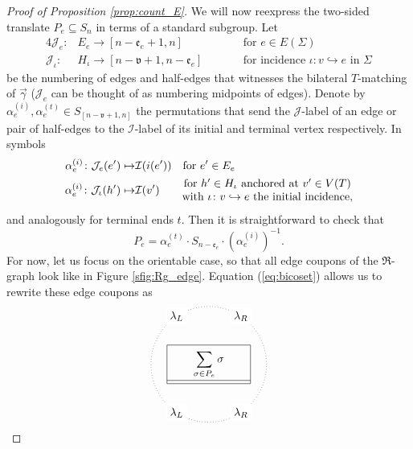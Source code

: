 \documentclass{amsart}
\begin{document}
\begin{proof}[Proof of Proposition \ref{prop:count_E}]
We will now reexpress the two-sided translate $P_e\subseteq S_n$ in terms of a standard subgroup. Let
\begin{alignat*}{4}
\mathcal{J}_e\colon&E_e\to[n-\mathfrak{e}_e+1,n]&&\text{for }e\in E(\Sigma)\\
\mathcal{J}_\iota\colon&H_\iota\to[n-\mathfrak{v}+1,n-\mathfrak{e}_e]\qquad&&\text{for incidence }\iota\colon v\hookrightarrow e\text{ in }\Sigma
\end{alignat*}
be the numbering of edges and half-edges that witnesses the bilateral $T$-matching of $\vec\gamma$ ($\mathcal{J}_e$ can be thought of as numbering midpoints of edges). Denote by $\alpha^{(i)}_e,\alpha^{(t)}_e\in S_{[n-\mathfrak{v}+1,n]}$ the permutations that send the $\mathcal{J}$-label of an edge or pair of half-edges to the $\mathcal{I}$-label of its initial and terminal vertex respectively. In symbols
\begin{align}\begin{split}\label{eq:alpha_beta}
\alpha^{(i)}_e\colon\mathcal{J}_e(e')\mapsto&\mathcal{I}(i(e'))\quad\text{for }e'\in E_e\\
\alpha^{(i)}_e\colon\mathcal{J}_\iota(h')\mapsto&\mathcal{I}(v')\hspace*{20pt}\begin{matrix}\text{for }h'\in H_\iota\text{ anchored at }v'\in V(T)\\\text{with }\iota\colon v\hookrightarrow e\text{ the initial incidence,}\end{matrix}
\end{split}\end{align}
and analogously for terminal ends $t$. Then it is straightforward to check that
\begin{equation}\label{eq:bicoset}
P_e=\alpha^{(t)}_e\cdot S_{n-\mathfrak{e}_e}\cdot(\alpha^{(i)}_e)^{-1}.
\end{equation}
For now, let us focus on the orientable case, so that all edge coupons of the $\mathfrak{R}$-graph look like in Figure \ref{sfig:Rg_edge}. Equation (\ref{eq:bicoset}) allows us to rewrite these edge coupons as
\begin{equation}\label{eq:standardise_summation}
\begin{tikzpicture}[baseline=0]
\draw[dotted](0,0)circle(1.8);
\node at(0,0){$\displaystyle\sum_{\sigma\in P_e}\sigma$};\node[fill=white](lli)at(-1,-1.5){$\lambda_L$};\node[fill=white](llo)at(-1,1.5){$\lambda_L$};\node[fill=white](lri)at(1,1.5){$\lambda_R$};\node[fill=white](lro)at(1,-1.5){$\lambda_R$};
\draw(-1.3,.6)--(1.3,.6)--(1.3,-.6)--(-1.3,-.6)--(-1.3,.6)(-1.3,-.5)--(1.3,-.5);

\end{tikzpicture}
\end{equation}
\end{proof}
\end{document}
